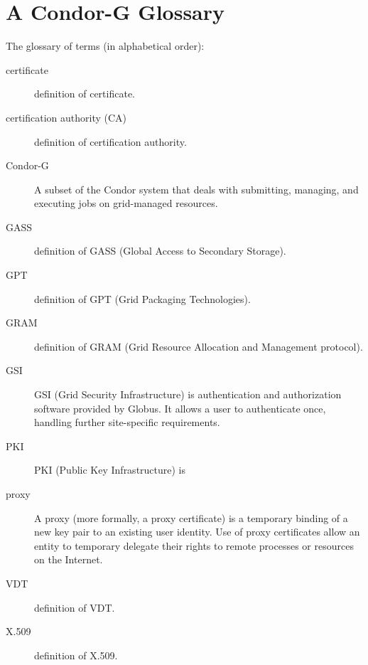 \section{\label{sec:Condor-G-Glossary}A Condor-G Glossary}

The glossary of terms (in alphabetical order):

\begin{description} 

\item[certificate] definition of certificate.

\item[certification authority (CA)] definition of certification authority.

\item[Condor-G]
A subset of the Condor system that deals with
submitting, managing, and executing jobs on grid-managed resources.

\item[GASS] definition of GASS (Global Access to Secondary Storage).

\item[GPT] definition of GPT (Grid Packaging Technologies).

\item[GRAM] definition of GRAM (Grid Resource Allocation and Management
protocol).

\item[GSI] GSI (Grid Security Infrastructure) is 
authentication and authorization software provided by Globus.
It allows a user to authenticate once,
handling further site-specific requirements.

\item[PKI] PKI (Public Key Infrastructure) is 

\item[proxy] A proxy (more formally, a proxy certificate) is
a temporary binding of a new key pair to an existing user identity.
Use of proxy certificates allow an entity to temporary delegate
their rights to remote processes or resources on the Internet. 


\item[VDT] definition of VDT.

\item[X.509] definition of X.509.

\end{description} 

